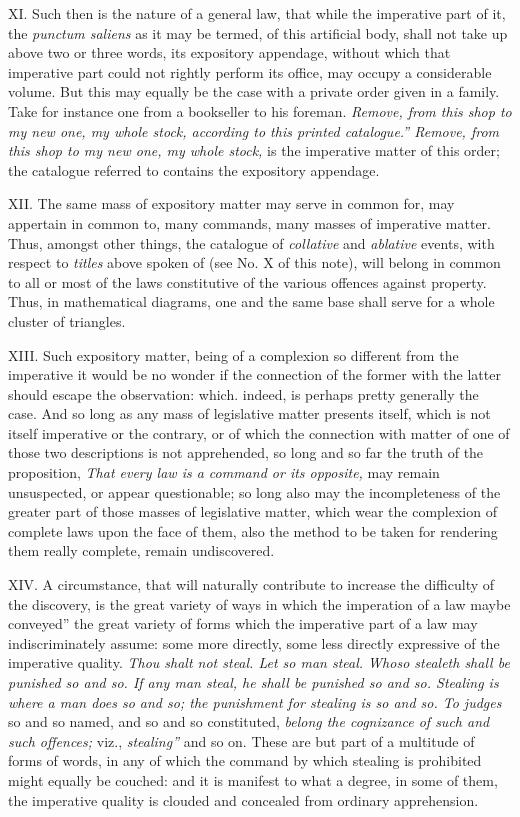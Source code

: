 \documentclass[12pt]{report}
\begin{document}
XI. Such then is the nature of a general law, that while the imperative
part of it, the \emph{punctum saliens} as it may be termed, of this
artificial body, shall not take up above two or three words, its
expository appendage, without which that imperative part could not
rightly perform its office, may occupy a considerable volume. But this
may equally be the case with a private order given in a family. Take for
instance one from a bookseller to his foreman. \emph{Remove, from this
shop to my new one, my whole stock, according to this printed
catalogue.'' Remove, from this shop to my new one, my whole
stock,} is the imperative matter of this order; the catalogue referred
to contains the expository appendage.

XII. The same mass of expository matter may serve in common for, may
appertain in common to, many commands, many masses of imperative matter.
Thus, amongst other things, the catalogue of \emph{collative} and
\emph{ablative} events, with respect to \emph{titles} above spoken of
(see No. X of this note), will belong in common to all or most of the
laws constitutive of the various offences against property. Thus, in
mathematical diagrams, one and the same base shall serve for a whole
cluster of triangles.

XIII. Such expository matter, being of a complexion so different from
the imperative it would be no wonder if the connection of the former
with the latter should escape the observation: which. indeed, is perhaps
pretty generally the case. And so long as any mass of legislative matter
presents itself, which is not itself imperative or the contrary, or of
which the connection with matter of one of those two descriptions is not
apprehended, so long and so far the truth of the proposition, \emph{That
every law is a command or its opposite,} may remain unsuspected, or
appear questionable; so long also may the incompleteness of the greater
part of those masses of legislative matter, which wear the complexion of
complete laws upon the face of them, also the method to be taken for
rendering them really complete, remain undiscovered.

XIV. A circumstance, that will naturally contribute to increase the
difficulty of the discovery, is the great variety of ways in which the
imperation of a law maybe conveyed'' the great variety of forms
which the imperative part of a law may indiscriminately assume: some
more directly, some less directly expressive of the imperative quality.
\emph{Thou shalt not steal. Let so man steal. Whoso stealeth shall be
punished so and so. If any man steal, he shall be punished so and so.
Stealing is where a man does so and so; the punishment for stealing is
so and so. To judges} so and so named, and so and so constituted,
\emph{belong the cognizance of such and such offences;} viz.,
\emph{stealing''} and so on. These are but part of a multitude
of forms of words, in any of which the command by which stealing is
prohibited might equally be couched: and it is manifest to what a
degree, in some of them, the imperative quality is clouded and concealed
from ordinary apprehension.
\end{document}
